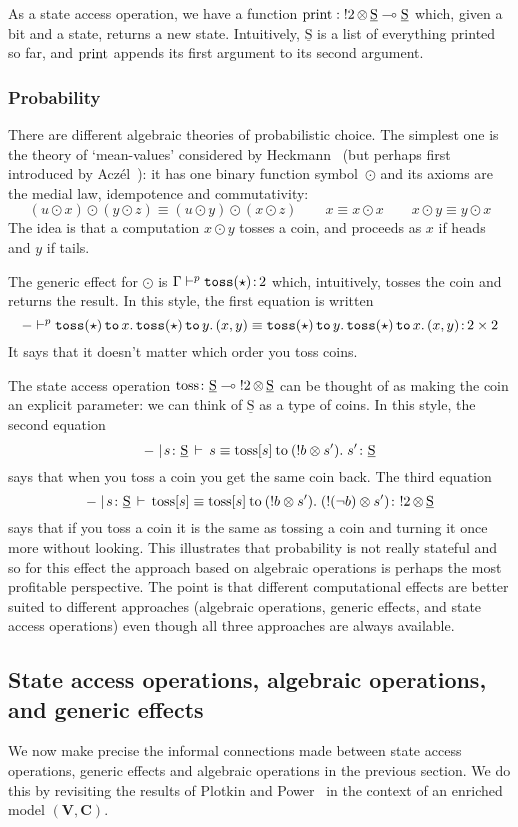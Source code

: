 \documentclass{LMCS}
\newcommand{\pj}[3]{#1 \mathrel{\vdash^p} #2 \colon \! #3}
\newcommand{\peq}[4]{#1 \mathrel{\vdash^p} #2\equiv #3 \colon \! #4}
\newcommand{\slet}[3]{#2 \, \codefont{to} \, #1 \ld #3}
\newcommand{\EECstate}{\underline{\mathrm{S}}}
\newcommand{\codefont}[1]{\mathtt{#1}}
\newcommand{\ld}{\mathpunct{.}}
\newcommand{\tensor}{\otimes}
\newcommand{\ltensortype}[2]{{!} #1 \, {\tensor} \, #2}
\newcommand{\ltensorterm}[2]{{!  #1} \tensor #2}
\newcommand{\letdot}[4]{{#3}\:\mathrm{to}\:{(\ltensorterm{#1}{#2})}.\;#4}
\newcommand{\rIn}[2]{#1 \colon  #2}
\newcommand{\aeq}[5]{#1 \mid  \! #2 \, \vdash \, \rIn{#3\equiv #4}{#5}}
\newcommand{\VCat}{\fixedcatfont{V}} \newcommand{\CCat}{\fixedcatfont{C}} \newcommand{\DCat}{\fixedcatfont{D}}
\newcommand{\fixedcatfont}{\mathbf}
\begin{document}
As a state access operation, 
we have a function
$\sprint : \ltensortype{2}\EECstate\lpop\EECstate$
which, given a bit and a state, returns a new state.
Intuitively, $\EECstate$ is a list of everything printed so far,
and $\mathrm{print}$ appends its first argument to its second argument.

\subsubsection*{Probability}
There are different algebraic theories of probabilistic choice.
The simplest one is the theory of `mean-values'
considered by Heckmann~\cite{h-probdom}
(but perhaps first introduced by Acz\'el~\cite{on-mean-values}):
it has one binary function 
symbol~$\odot$ and its axioms are
the medial law, idempotence and commutativity:
\[
(u\odot x)\odot(y\odot z)\equiv 
(u\odot y)\odot(x\odot z)
\qquad
x\equiv x\odot x
\qquad
x\odot y\equiv y\odot x
\]
The idea is that a computation $x\odot y$ tosses a coin, and proceeds as $x$ 
if heads and $y$ if tails.

The generic effect for $\odot$ is $\pj{\Gamma}{\etoss(\star)}{2}$ which,
intuitively, tosses the coin and returns the result.
In this style, the first equation is written
\[\peq{-}
{\slet{x}{\etoss(\star)}
\slet{y}{\etoss(\star)}
{(x,y)}}
{\slet y{\etoss(\star)}
\slet x{\etoss(\star)}
{(x,y)}}
{2\times 2}
\]
It says that it doesn't matter which order you toss coins.

The state access operation 
$\stoss\colon \EECstate\lpop\ltensortype{2}\EECstate$ 
can be thought of as making the coin an explicit parameter:
we can think of $\EECstate$ as a type of coins.
In this style, the second equation  
\[
\aeq{-}{s\colon\EECstate}
{s}
{\letdot{b}{s'}{\stoss[s]}{s'}}
{\EECstate}
\]
says that when you toss a coin you get the same coin back.
The third equation
\[
\aeq{-}{s\colon\EECstate}
{\stoss[s]}
{\letdot{b}{s'}{\stoss[s]}{(\ltensorterm{(\neg b)}s')}}
{\ltensortype 2\EECstate}
\]
says that if you toss a coin it is the same as tossing a coin 
and turning it once more without looking.
This illustrates that probability is not really stateful and so 
for this effect the approach based on algebraic operations
is perhaps the most profitable perspective. 
The point is that different computational effects
are better suited to different approaches (algebraic operations,
generic effects, and state access operations)
even though all three approaches are always available.

\subsection{State access operations, algebraic operations, and generic effects}
\label{sec:sao-so-geff}
We now make precise the informal connections made between 
state access operations, generic effects and algebraic operations
in the previous section.
We do this by revisiting the results
of Plotkin and Power~\cite{Plotkin:Power:03} 
in the context of an 
enriched model $(\VCat,\CCat)$.
\end{document}
